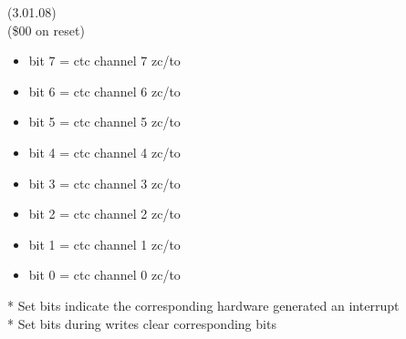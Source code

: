  (3.01.08)\\
(\$00 on reset)
\begin{itemize}
\item bit 7 = ctc channel 7 zc/to
\item bit 6 = ctc channel 6 zc/to
\item bit 5 = ctc channel 5 zc/to
\item bit 4 = ctc channel 4 zc/to
\item bit 3 = ctc channel 3 zc/to
\item bit 2 = ctc channel 2 zc/to
\item bit 1 = ctc channel 1 zc/to
\item bit 0 = ctc channel 0 zc/to
\end{itemize}
* Set bits indicate the corresponding hardware generated an interrupt\\
* Set bits during writes clear corresponding bits



